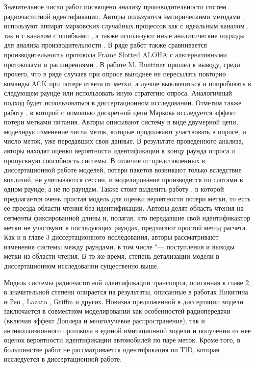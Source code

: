 Значительное число работ посвящено анализу производительности систем радиочастотной идентификации. Авторы пользуются эмпирическими методами \cite{Buettner2008}, используют аппарат марковских случайных процессов как с идеальным каналом \cite{Vogt2002, Wang2009, Vahedi2012, Vales-Alonso2009, Vales-Alonso2011, Tong2007, Vales-Alonso2017}, так и с каналом с ошибками \cite{DiMarco2014}, а также используют иные аналитические подходы для анализа производительности \cite{Ahmed2016, Yan2014, Jeon2009, Kim2007}. В ряде работ также сравнивается производительность протокола Frame Slotted ALOHA с альтернативными протоколами и расширениями \cite{Vahedi2014, LaPorta2011}. В работе \cite{Buettner2008} M. Buettner пришел к выводу, среди прочего, что в ряде случаев при опросе выгоднее не пересылать повторно команды ACK при потере ответа от метки, а лучше выключиться и попробовать в следующем раунде или использовать иную стратегию опроса. Аналогичный подход будет использоваться в диссертационном исследовании. Отметим также работу \cite{Vales-Alonso2017}, в которой с помощью дискретной цепи Маркова исследуется эффект потери метками питания. Авторы описывают систему в виде двумерной цепи, моделируя изменение числа меток, которые продолжают участвовать в опросе, и число меток, уже передавших свои данные. В результате проведенного анализа, авторы находят оценки вероятности идентификации к концу раунда опроса и пропускную способность системы. В отличие от представленных в диссертационной работе моделей, потери пакетов возникают только вследствие коллизий, не учитываются сессии, и моделирование производится по слотами в одном раунде, а не по раундам. Также стоит выделить работу \cite{Pawowicz2020}, в которой предлагается очень простая модель для оценки вероятности потери метки, то есть ее проезда области чтения без идентификации. Авторы делят область чтения на сегменты фиксированной длины и, полагая, что передавшие свой идентификактор метки не участвуют в последующих раундах, предлагают простой метод расчета. Как и в главе 3 диссертационного исследования, авторы \cite{Pawowicz2020} рассматривают изменения системы между раундами, в том числе "--- поступления и выходы метки из области чтения. В то же время, степень детализации модели в диссертационном исследовании существенно выше.

Модель системы радиочастотной идентификации транспорта, описанная в главе 2, в значительной степени опирается на результаты, описанные в работах Никитина и Рао \cite{Nikitin2008}, Lazaro \cite{Lazaro2009}, Griffin \cite{Griffin2009} и других. Новизна предложенной в диссертации модели заключается в совместном моделировании как особенностей радиопередачи (включая эффект Доплера и многолучевое распространение), так и антиколлизионного протокола в единой имитационной модели и получении из нее оценок вероятности идентификации автомобилей по паре меток. Кроме того, в большинстве работ не рассматривается идентификация по TID, которая исследуется в диссертационной работе.

